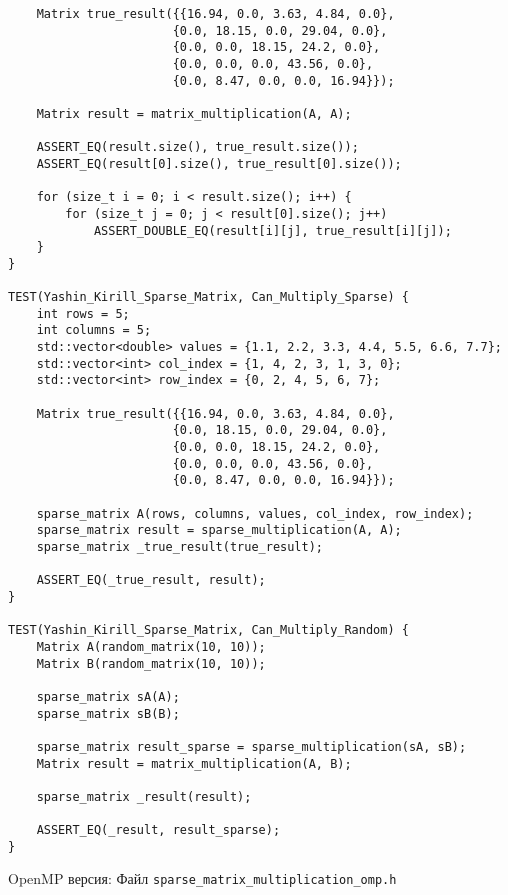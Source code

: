 \documentclass{report}
\begin{document}
\begin{lstlisting}
    Matrix true_result({{16.94, 0.0, 3.63, 4.84, 0.0},
                       {0.0, 18.15, 0.0, 29.04, 0.0},
                       {0.0, 0.0, 18.15, 24.2, 0.0},
                       {0.0, 0.0, 0.0, 43.56, 0.0},
                       {0.0, 8.47, 0.0, 0.0, 16.94}});

    Matrix result = matrix_multiplication(A, A);

    ASSERT_EQ(result.size(), true_result.size());
    ASSERT_EQ(result[0].size(), true_result[0].size());

    for (size_t i = 0; i < result.size(); i++) {
        for (size_t j = 0; j < result[0].size(); j++)
            ASSERT_DOUBLE_EQ(result[i][j], true_result[i][j]);
    }
}

TEST(Yashin_Kirill_Sparse_Matrix, Can_Multiply_Sparse) {
    int rows = 5;
    int columns = 5;
    std::vector<double> values = {1.1, 2.2, 3.3, 4.4, 5.5, 6.6, 7.7};
    std::vector<int> col_index = {1, 4, 2, 3, 1, 3, 0};
    std::vector<int> row_index = {0, 2, 4, 5, 6, 7};

    Matrix true_result({{16.94, 0.0, 3.63, 4.84, 0.0},
                       {0.0, 18.15, 0.0, 29.04, 0.0},
                       {0.0, 0.0, 18.15, 24.2, 0.0},
                       {0.0, 0.0, 0.0, 43.56, 0.0},
                       {0.0, 8.47, 0.0, 0.0, 16.94}});

    sparse_matrix A(rows, columns, values, col_index, row_index);
    sparse_matrix result = sparse_multiplication(A, A);
    sparse_matrix _true_result(true_result);

    ASSERT_EQ(_true_result, result);
}

TEST(Yashin_Kirill_Sparse_Matrix, Can_Multiply_Random) {
    Matrix A(random_matrix(10, 10));
    Matrix B(random_matrix(10, 10));

    sparse_matrix sA(A);
    sparse_matrix sB(B);

    sparse_matrix result_sparse = sparse_multiplication(sA, sB);
    Matrix result = matrix_multiplication(A, B);

    sparse_matrix _result(result);

    ASSERT_EQ(_result, result_sparse);
}

\end{lstlisting}
OpenMP версия:
\newline
Файл \verb|sparse_matrix_multiplication_omp.h|
\end{document}

